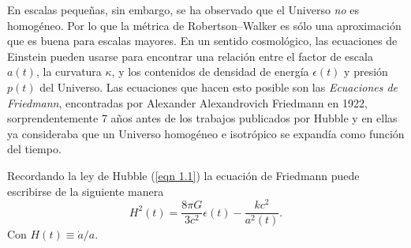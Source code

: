 \documentclass[a4paper,openright,12pt]{book}
\begin{document}
En escalas pequeñas, sin embargo, se ha observado que el Universo \textit{no} es homogéneo. Por lo que la métrica de Robertson--Walker es sólo una aproximación que es buena para escalas mayores. En un sentido cosmológico, las ecuaciones de Einstein pueden usarse para encontrar una relación entre el factor de escala $a(t)$, la curvatura $\kappa$, y los contenidos de densidad de energía $\epsilon(t)$ y presión $p(t)$ del Universo. Las ecuaciones que hacen esto posible son las \textit{Ecuaciones de Friedmann}, encontradas por Alexander Alexandrovich Friedmann en 1922, sorprendentemente 7 años antes de los trabajos publicados por Hubble y en ellas ya consideraba que un Universo homogéneo e isotrópico se expandía como función del tiempo. 

Recordando la ley de Hubble (\ref{eqn 1.1}) la ecuación de Friedmann puede escribirse de la siguiente manera
\begin{equation}
H^{2}(t) = \frac{8 \pi G}{3 c^{2}}\epsilon(t) 
-\frac{k c^{2}}{a^{2}(t)}.\label{eqn 1.19}
\end{equation}
Con $H(t) \equiv \dot{a}/a$.
\end{document}
